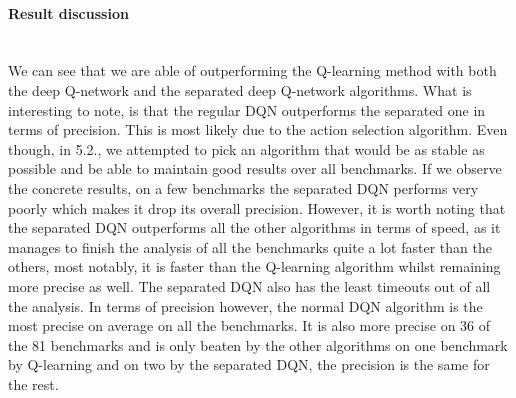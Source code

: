 \paragraph{Result discussion}\mbox{}\\
We can see that we are able of outperforming the Q-learning method with both the deep Q-network and the separated deep Q-network algorithms. What is interesting to note, is that the regular DQN outperforms the separated one in terms of precision. This is most likely due to the action selection algorithm. Even though, in 5.2., we attempted to pick an algorithm that would be as stable as possible and be able to maintain good results over all benchmarks. If we observe the concrete results, on a few benchmarks the separated DQN performs very poorly which makes it drop its overall precision. However, it is worth noting that the separated DQN outperforms all the other algorithms in terms of speed, as it manages to finish the analysis of all the benchmarks quite a lot faster than the others, most notably, it is faster than the Q-learning algorithm whilst remaining more precise as well. The separated DQN also has the least timeouts out of all the analysis. In terms of precision however, the normal DQN algorithm is the most precise on average on all the benchmarks. It is also more precise on 36 of the 81 benchmarks and is only beaten by the other algorithms on one benchmark by Q-learning and on two by the separated DQN, the precision is the same for the rest.
































